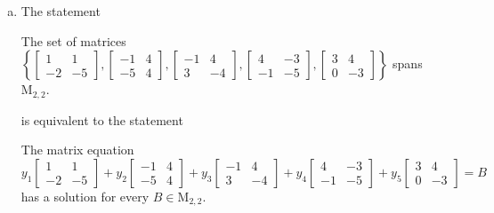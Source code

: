 \begin{exerciseAnswer}
\begin{enumerate}[(a)]
\item The statement 
\begin{center}\begin{minipage}{0.8\textwidth}
 The set of matrices \( \left\{ \left[\begin{array}{cc}
1 & 1 \\
-2 & -5
\end{array}\right] , \left[\begin{array}{cc}
-1 & 4 \\
-5 & 4
\end{array}\right] , \left[\begin{array}{cc}
-1 & 4 \\
3 & -4
\end{array}\right] , \left[\begin{array}{cc}
4 & -3 \\
-1 & -5
\end{array}\right] , \left[\begin{array}{cc}
3 & 4 \\
0 & -3
\end{array}\right] \right\} \) spans \(\mathrm{M}_{2,2}\). 
\end{minipage}\end{center}
     is equivalent to the statement 
\begin{center}\begin{minipage}{0.8\textwidth}
 The matrix equation \[ y_{1} \left[\begin{array}{cc}
1 & 1 \\
-2 & -5
\end{array}\right] + y_{2} \left[\begin{array}{cc}
-1 & 4 \\
-5 & 4
\end{array}\right] + y_{3} \left[\begin{array}{cc}
-1 & 4 \\
3 & -4
\end{array}\right] + y_{4} \left[\begin{array}{cc}
4 & -3 \\
-1 & -5
\end{array}\right] + y_{5} \left[\begin{array}{cc}
3 & 4 \\
0 & -3
\end{array}\right] =B\] has a solution for every \(B \in \mathrm{M}_{2,2}\). 
\end{minipage}\end{center}
    

\end{enumerate}
\end{exerciseAnswer}
